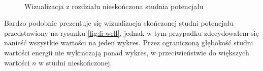 \documentclass{SGGW-thesis}
\begin{document}
	\begin{figure}[H]
		\\
		\caption{Wizualizacja z rozdziału nieskończona studnia potencjału}
		\label{fig:inf-well}
	\end{figure}
	
	Bardzo podobnie prezentuje się wizualizacja skończonej studni potencjału przedstawiony na rysunku \ref{fig:fi-well}, jednak w tym przypadku zdecydowałem się nanieść wszystkie wartości na jeden wykres. Przez ograniczoną głębokość studni wartości energii nie wykraczają ponad wykres, w przeciwieństwie do większych wartości $n$ w studni nieskończonej.
	
\end{document}
